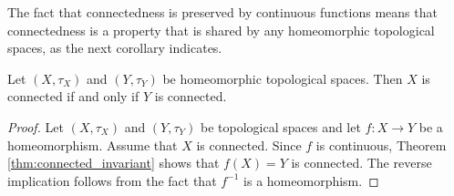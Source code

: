 









The fact that connectedness is preserved by continuous functions means that connectedness is a property that is shared by any homeomorphic topological spaces, as the next corollary indicates. 

\begin{corollary} Let $(X, \tau_X)$ and $(Y, \tau_Y)$ be homeomorphic topological spaces. Then $X$ is connected if and only if $Y$ is connected. 
\end{corollary}

\begin{proof} Let $(X, \tau_X)$ and $(Y, \tau_Y)$ be topological spaces and let $f: X \to Y$ be a homeomorphism. Assume that $X$ is connected. Since $f$ is continuous, Theorem \ref{thm:connected_invariant} shows that $f(X) = Y$ is connected. The reverse implication follows from the fact that $f^{-1}$ is a homeomorphism. 
\end{proof}

